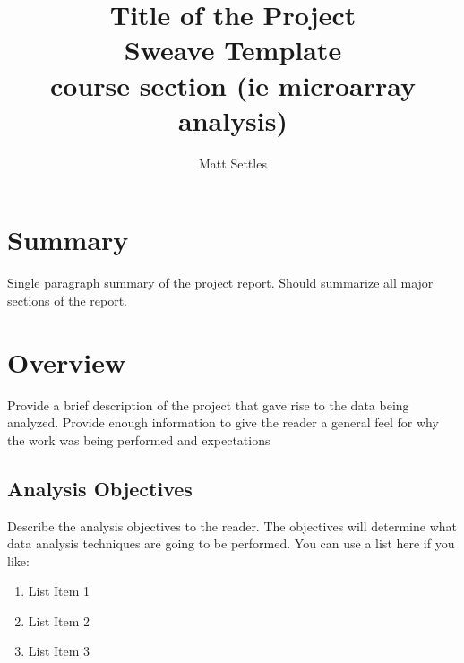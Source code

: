 \documentclass[12pt]{article}
\begin{document}

\title{Title of the Project\\Sweave Template\\\small{course section 
(ie microarray analysis)}}  %
\author{Matt Settles}
\maketitle %

\section*{Summary}
Single paragraph summary of the project report. Should summarize all major
sections of the report.

\newpage  %

\tableofcontents %

\section{Overview}
Provide a brief description of the project that gave rise to the data being
analyzed. Provide enough information to give the reader a general feel for 
why the work was being performed and expectations

\subsection{Analysis Objectives}
Describe the analysis objectives to the reader. The objectives will determine
what data analysis techniques are going to be performed. You can use a list here
if you like:
\begin{enumerate} %
  \item List Item 1
  \item List Item 2
  \item List Item 3
\end{enumerate}
\end{document}
